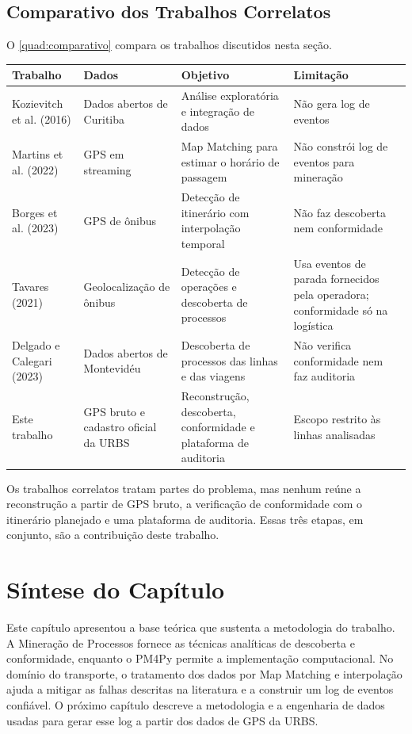 \subsection{Comparativo dos Trabalhos Correlatos}\label{subsec:comparativo}

O \autoref{quad:comparativo} compara os trabalhos discutidos nesta seção.

\begin{tabframed}[htb]
\caption{Comparação dos trabalhos correlatos}
\label{quad:comparativo}
\begin{tabular}{|p{2.2cm}|p{3.7cm}|p{3.7cm}|p{3.7cm}|}
\hline
\textbf{Trabalho} & \textbf{Dados} & \textbf{Objetivo} & \textbf{Limitação} \\ \hline
Kozievitch et al. (2016) & Dados abertos de Curitiba & Análise exploratória e integração de dados & Não gera log de eventos \\ \hline
Martins et al. (2022) & GPS em streaming & Map Matching para estimar o horário de passagem & Não constrói log de eventos para mineração \\ \hline
Borges et al. (2023) & GPS de ônibus & Detecção de itinerário com interpolação temporal & Não faz descoberta nem conformidade \\ \hline
Tavares (2021) & Geolocalização de ônibus & Detecção de operações e descoberta de processos & Usa eventos de parada fornecidos pela operadora; conformidade só na logística \\ \hline
Delgado e Calegari (2023) & Dados abertos de Montevidéu & Descoberta de processos das linhas e das viagens & Não verifica conformidade nem faz auditoria \\ \hline
Este trabalho & GPS bruto e cadastro oficial da URBS & Reconstrução, descoberta, conformidade e plataforma de auditoria & Escopo restrito às linhas analisadas \\ \hline
\end{tabular}
\fonte{}
\end{tabframed}

Os trabalhos correlatos tratam partes do problema, mas nenhum reúne a reconstrução a partir de GPS bruto, a verificação de conformidade com o itinerário planejado e uma plataforma de auditoria. Essas três etapas, em conjunto, são a contribuição deste trabalho.

\section{Síntese do Capítulo}\label{sec:sinteseCap2}

Este capítulo apresentou a base teórica que sustenta a metodologia do trabalho. A Mineração de Processos fornece as técnicas analíticas de descoberta e conformidade, enquanto o PM4Py permite a implementação computacional. No domínio do transporte, o tratamento dos dados por Map Matching e interpolação ajuda a mitigar as falhas descritas na literatura e a construir um log de eventos confiável. O próximo capítulo descreve a metodologia e a engenharia de dados usadas para gerar esse log a partir dos dados de GPS da URBS.
